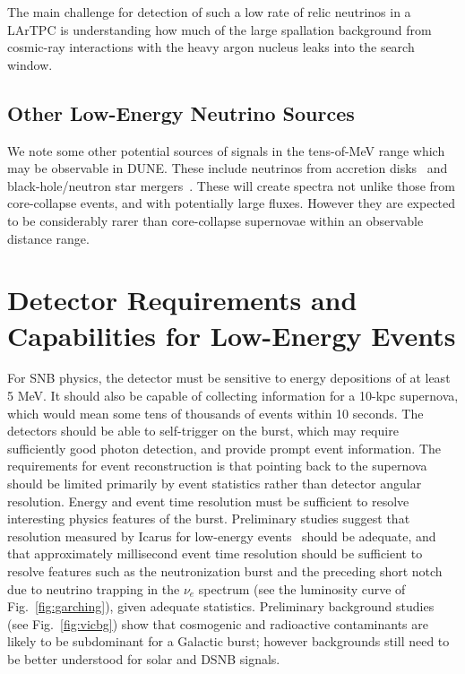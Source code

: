  The main challenge for detection of such
a low rate of relic neutrinos in a LArTPC is understanding how much of
the large spallation background from cosmic-ray interactions with the
heavy argon nucleus 
leaks into the search window. 

\subsection{Other Low-Energy Neutrino Sources}

We note some other potential sources of signals in the tens-of-MeV range which may be observable in DUNE.  These include neutrinos from accretion disks~\cite{Caballero:2011dw} and black-hole/neutron star mergers~\cite{Caballero:2009ww}.  These will create spectra not unlike those from core-collapse events, and with potentially large fluxes.  However they are expected to be considerably rarer than core-collapse supernovae within an observable distance range.


\section{Detector Requirements and Capabilities for Low-Energy Events}
\label{sec:physics-snblowe-detector-requirements}

For SNB physics, the detector must be sensitive to energy depositions of at least 5 MeV.  It should also be capable of collecting information for a 10-kpc supernova, which would mean some tens of thousands of events within 10 seconds.    The detectors should be able to self-trigger on the burst, which may require sufficiently good photon detection, and provide prompt event information. 
The requirements for event reconstruction is that pointing back to the supernova should be limited primarily by event statistics rather than detector angular resolution.
Energy and event time resolution must be sufficient to resolve interesting physics features of the burst.  Preliminary studies suggest that resolution measured by Icarus for low-energy events~\cite{Amoruso:2003sw} should be adequate, and that approximately millisecond event time resolution should be sufficient to resolve features such as the neutronization burst and the preceding short notch due to neutrino trapping in the $\nu_e$ spectrum (see the luminosity curve of Fig.~\ref{fig:garching}), given adequate statistics.   Preliminary background studies (see Fig.~\ref{fig:vicbg}) show that cosmogenic and radioactive contaminants are likely to be subdominant for a Galactic burst; however backgrounds still need to be better understood for solar and DSNB signals.

